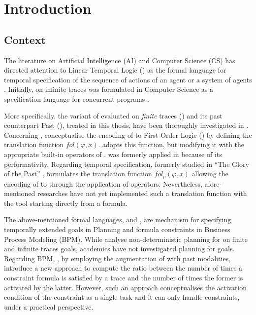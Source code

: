 \chapter{Introduction}
\section{Context}
The literature on Artificial Intelligence (AI) and Computer Science (CS) has directed attention to Linear Temporal Logic (\LTL) as the formal language for temporal specification of the sequence of actions of an agent or a system of agents \citep{fagin2004reasoning}. Initially, \LTL on infinite traces was formulated in Computer Science as a specification language for concurrent programs \citep{Pnueli:1977:TLP:1382431.1382534}.

More specifically, the variant of \LTL evaluated on \textit{finite} traces (\LTLf) and its past counterpart  Past \LTL (\PLTL), treated in this thesis, have been thoroughly investigated in \cite{de2013linear,lichtenstein1985glory}. Concerning \LTLf, \cite{de2013linear} conceptualise the encoding of \LTLf to First-Order Logic (\FOL) by defining the translation function $fol(\varphi, x)$. \cite{zpv2018} adopts this function, but modifying it with the appropriate built-in operators of \MONA. \MONA was formerly applied in \cite{zhu2017symbolic} because of its performativity. Regarding \PLTL temporal specification, formerly studied in ``The Glory of the Past'' \citep{lichtenstein1985glory}, \cite{zpv2018} formulates the translation function $fol_p(\varphi, x)$ allowing the encoding of \PLTL to \FOL through the application of \MONA operators. Nevertheless, afore-mentioned researches have not yet implemented such a translation function with the \MONA tool starting directly from a \PLTL formula. 

The above-mentioned formal languages, \LTLf and \PLTL, are mechanism for specifying temporally extended goals in Planning and formula constraints in Business Process Modeling (BPM). While \cite{camacho2017non} analyse non-deterministic planning for \LTL on finite and infinite traces goals, academics have not investigated planning for \PLTL goals. Regarding BPM, \cite{cecconi2018interestingness}, by employing the augmentation of \LTLf with past modalities, introduce a new approach to compute the ratio between the number of times a constraint formula is satisfied by a trace and the number of times the former is activated by the latter. However, such an approach conceptualises the activation condition of the constraint as a single task and it can only handle \declare constraints, under a practical perspective.

